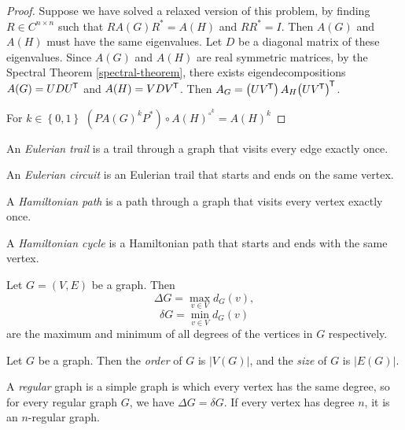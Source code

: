\begin{proof}
    Suppose we have solved a relaxed version of this problem, by finding $R \in C^{n \times n}$ such that $RA(G)R^{*} = A(H)$ and $RR^{*} = I$. Then $A(G)$ and $A(H)$ must have the same eigenvalues. Let $D$ be a diagonal matrix of these eigenvalues. Since $A(G)$ and $A(H)$ are real symmetric matrices, by the Spectral Theorem \ref{spectral-theorem}, there exists eigendecompositions $A(G) = UD{U}^{\mkern-1.5mu\mathsf{T}}$ and $A(H) = VD{V}^{\mkern-1.5mu\mathsf{T}}$. Then $A_G = \left(U{V}^{\mkern-1.5mu\mathsf{T}}\right)A_H{\left(U{V}^{\mkern-1.5mu\mathsf{T}}\right)}^{\mkern-1.5mu\mathsf{T}}$.

    For $k \in \left\{0, 1\right\}$
    $\left(PA(G)^{k}P^{*}\right) \circ A(H)^{\circ^k} = A(H)^{k}$
\end{proof}

\begin{defn}
    An \emph{Eulerian trail} is a trail through a graph that visits every edge exactly once.
\end{defn}

\begin{defn}
    An \emph{Eulerian circuit} is an Eulerian trail that starts and ends on the same vertex.
\end{defn}

\begin{defn}
    A \emph{Hamiltonian path} is a path through a graph that visits every vertex exactly once.
\end{defn}

\begin{defn}
    A \emph{Hamiltonian cycle} is a Hamiltonian path that starts and ends with the same vertex.
\end{defn}

\begin{defn}
    Let $G = (V, E)$ be a graph. Then
    \[\Delta G = \max_{v \in V}d_G(v),\]
    \[\delta G = \min_{v \in V}d_G(v)\] are the maximum and minimum of all degrees of the vertices in $G$ respectively.
\end{defn}

\begin{defn}
    Let $G$ be a graph. Then the \emph{order} of $G$ is $|V(G)|$, and the \emph{size} of $G$ is $|E(G)|$.
\end{defn}

\begin{defn}
    A \emph{regular} graph is a simple graph is which every vertex has the same degree, so for every regular graph $G$, we have $\Delta G = \delta G$. If every vertex has degree $n$, it is an $n$-regular graph.
\end{defn}


